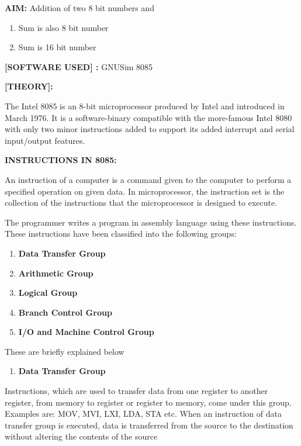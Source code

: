 \documentclass[11pt,twocolumn]{article}
\begin{document}
\textbf{AIM:} Addition of two 8 bit numbers and

\begin{enumerate}
\def\labelenumi{\arabic{enumi}.}
\item
  Sum is also 8 bit number
\item
  Sum is 16 bit number
\end{enumerate}

\textbf{{[}SOFTWARE USED{]} :} GNUSim 8085

\textbf{{[}THEORY{]}:}

The Intel 8085 is an 8-bit microprocessor produced by Intel and
introduced in March 1976. It is a software-binary compatible with the
more-famous Intel 8080 with only two minor instructions added to support
its added interrupt and serial input/output features.

\textbf{INSTRUCTIONS IN 8085:}

An instruction of a computer is a command given to the computer to
perform a specified operation on given data. In microprocessor, the
instruction set is the collection of the instructions that the
microprocessor is designed to execute.

The programmer writes a program in assembly language using these
instructions. These instructions have been classified into the following
groups:

\begin{enumerate}
\def\labelenumi{\arabic{enumi}.}
\item
  \textbf{Data Transfer Group}
\item
  \textbf{Arithmetic Group}
\item
  \textbf{Logical Group}
\item
  \textbf{Branch Control Group}
\item
  \textbf{I/O and Machine Control Group}
\end{enumerate}

These are briefly explained below

\begin{enumerate}
\def\labelenumi{\arabic{enumi}.}
\tightlist
\item
  \textbf{Data Transfer Group}
\end{enumerate}

Instructions, which are used to transfer data from one register to
another register, from memory to register or register to memory, come
under this group. Examples are: MOV, MVI, LXI, LDA, STA etc. When an
instruction of data transfer group is executed, data is transferred from
the source to the destination without altering the contents of the
source
\end{document}
